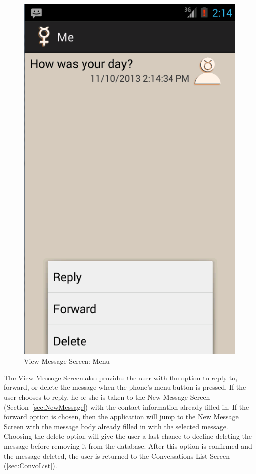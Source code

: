 \documentclass{article}
\begin{document}
\begin{figure}[ht!]
\centering
\includegraphics[width=.25\textwidth]{"./Screen_shots/View_Individual_message_Menu"}{}
\caption{View Message Screen: Menu}
\label{fig:ViewMsgMenu}
\end{figure}


\par The View Message Screen also provides the user with the option to reply to, forward, or delete the message when the phone's menu button is pressed. 
If the user chooses to reply, he or she is taken to the New Message Screen (Section~\ref{sec:NewMessage}) with the contact information already filled in.
 If the forward option is chosen, then the application will jump to the New Message Screen with the message body already filled in with the selected message.
Choosing the delete option will give the user a last chance to decline deleting the message before removing it from the database.
After this option is confirmed and the message deleted, the user is returned to the Conversations List Screen (\autoref{sec:ConvoList}).
\end{document}
